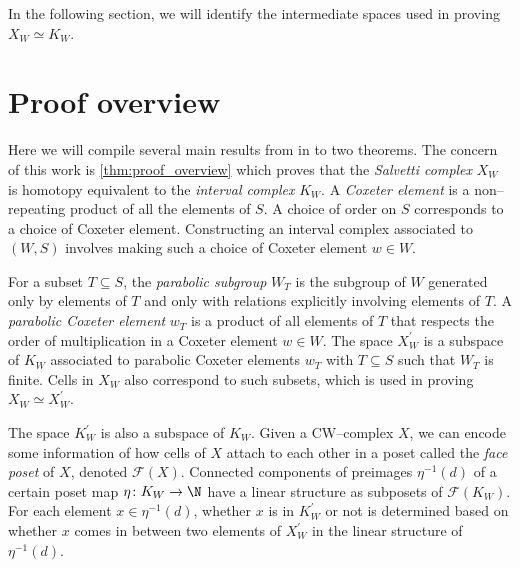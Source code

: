 In the following section, we will identify the intermediate spaces used in proving $X_W \simeq K_W$.

\section{Proof overview}

Here we will compile several main results from \cite{paolini_salvetti_kpi1_2021} in to two theorems. The concern of this work is \cref{thm:proof_overview} which proves that the \emph{Salvetti complex} $X_W$ is homotopy equivalent to the \emph{interval complex} $K_W$. A \emph{Coxeter element} is a non--repeating product of all the elements of $S$. A choice of order on $S$ corresponds to a choice of Coxeter element. Constructing an interval complex associated to $(W,S)$ involves making such a choice of Coxeter element $w \in W$.

For a subset $T \subseteq S$, the \emph{parabolic subgroup} $W_T$ is the subgroup of $W$ generated only by elements of $T$ and only with relations explicitly involving elements of $T$. A \emph{parabolic Coxeter element} $w_T$ is a product of all elements of $T$ that respects the order of multiplication in a Coxeter element $w \in W$. The space $X_W^\prime$ is a subspace of $K_W$ associated to parabolic Coxeter elements $w_T$ with $T \subseteq S$ such that $W_T$ is finite. Cells in $X_W$ also correspond to such subsets, which is used in proving $X_W \simeq X_W^\prime$.

The space $K_W^\prime$ is also a subspace of $K_W$. Given a CW--complex $X$, we can encode some information of how cells of $X$ attach to each other in a poset called the \emph{face poset} of $X$, denoted $\mathcal{F}(X)$. Connected components of preimages $\eta^{-1}(d)$ of a certain poset map $\eta \colon K_W \to \N$ have a linear structure as subposets of $\mathcal{F}(K_W)$. For each element $x \in \eta^{-1}(d)$, whether $x$ is in $K_W^\prime$ or not is determined based on whether $x$ comes in between two elements of $X_W^\prime$ in the linear structure of $\eta^{-1}(d)$.

